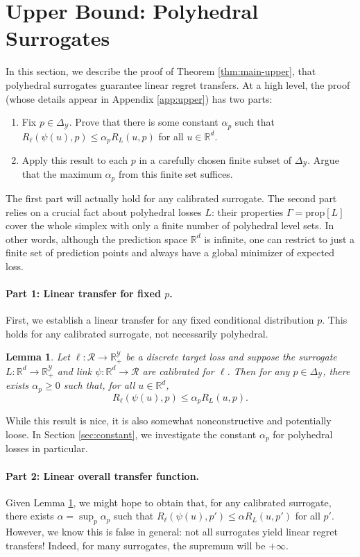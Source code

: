 \documentclass{article}
\newtheorem{lemma}{Lemma}
\theoremstyle{definition}\newtheorem{definition}{Definition}
\theoremstyle{definition}\newtheorem{assumption}{Assumption}
\newcommand{\reals}{\mathbb{R}}
\newcommand{\prop}[1]{\mathrm{prop}[#1]}
\newcommand{\simplex}{\Delta_\Y}
\newcommand{\R}{\mathcal{R}}
\newcommand{\Y}{\mathcal{Y}}
\begin{document}
\section{Upper Bound: Polyhedral Surrogates} \label{sec:upper}
In this section, we describe the proof of Theorem \ref{thm:main-upper}, that polyhedral surrogates guarantee linear regret transfers.
At a high level, the proof (whose details appear in Appendix \ref{app:upper}) has two parts:
\begin{enumerate}
  \item Fix $p \in \simplex$.
        Prove that there is some constant $\alpha_p$ such that $R_{\ell}(\psi(u),p) \leq \alpha_p R_L(u,p)$ for all $u\in\reals^d$.
      \item Apply this result to each $p$ in a carefully chosen finite subset of $\simplex$.
        Argue that the maximum $\alpha_p$ from this finite set suffices.
\end{enumerate}
The first part will actually hold for any calibrated surrogate.
The second part relies on a crucial fact about polyhedral losses $L$: their properties $\Gamma=\prop{L}$ cover the whole simplex with only a finite number of polyhedral level sets.
In other words, although the prediction space $\reals^d$ is infinite, one can restrict to just a finite set of prediction points and always have a global minimizer of expected loss.

\paragraph{Part 1: Linear transfer for fixed $p$.}
First, we establish a linear transfer for any fixed conditional distribution $p$.
This holds for any calibrated surrogate, not necessarily polyhedral.
\begin{lemma} \label{lemma:fixed-p}
  Let $\ell: \R \to \reals_+^{\Y}$ be a discrete target loss and suppose the surrogate $L: \reals^d \to \reals_+^{\Y}$ and link $\psi: \reals^d \to \R$ are calibrated for $\ell$.
  Then for any $p \in \simplex$, there exists $\alpha_p \geq 0$ such that, for all $u \in \reals^d$,
    \[ R_{\ell}(\psi(u),p) \leq \alpha_p R_L(u,p) . \]
\end{lemma}
While this result is nice, it is also somewhat nonconstructive and potentially loose.
In Section \ref{sec:constant}, we investigate the constant $\alpha_p$ for polyhedral losses in particular.

\paragraph{Part 2: Linear overall transfer function.}
Given Lemma \ref{lemma:fixed-p}, we might hope to obtain that, for any calibrated surrogate, there exists $\alpha = \sup_p \alpha_p$ such that $R_{\ell}(\psi(u),p') \leq \alpha R_L(u,p')$ for all $p'$.
However, we know this is false in general: not all surrogates yield linear regret transfers!
Indeed, for many surrogates, the supremum will be $+\infty$.
\end{document}
